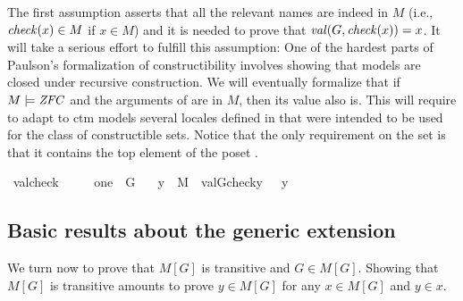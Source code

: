 The first assumption asserts that all the relevant names are indeed in
$M$ (i.e., $\operatorname{\mathit{check}}(x) \in M$ if $x\in M$) and it is needed to prove that
$\operatorname{\mathit{val}}(G,\operatorname{\mathit{check}}(x))=x$. It will take a serious effort to fulfill this
assumption: One of the hardest parts of Paulson's formalization of
constructibility involves showing that models are closed under
recursive construction. We will eventually formalize that if
$M\models\mathit{ZFC}$ and the arguments of  are in $M$, then its
value also is. This will require to adapt to ctm models several
locales defined in \cite{paulson_2003} that were intended to be used
for the class of constructible sets. Notice that the only requirement
on the set  is that it contains the top element of the poset
.

\begin{isabelle}
\isamarkupfalse%
\ valcheck\ {\isacharcolon}\ \isanewline
\ \ \ {\isachardoublequoteopen}one\ {\isasymin}\ G{\isachardoublequoteclose}\isanewline
\ \ \ {\isachardoublequoteopen}y\ {\isasymin}\ M\ {\isasymLongrightarrow}\ val{\isacharparenleft}G{\isacharcomma}check{\isacharparenleft}y{\isacharparenright}{\isacharparenright}\ \ {\isacharequal}\ y{\isachardoublequoteclose}
\end{isabelle}


\subsection{Basic results about the generic extension}

We turn now to prove that $M[G]$ is transitive and $G\in
M[G]$. Showing that $M[G]$ is transitive amounts to prove $y \in M[G]$
for any $x \in M[G]$ and $y \in x$. 

